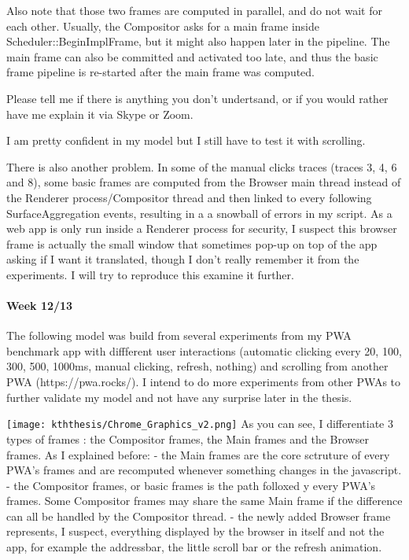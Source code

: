 \documentclass{kththesis}
\begin{document}
Also note that those two frames are computed in parallel, and do not wait for each other. Usually, the Compositor asks for a main frame inside  Scheduler::BeginImplFrame, but it might also happen later in the pipeline. The main frame can also be committed and activated too late, and thus the basic frame pipeline is re-started after the main frame was computed.

Please tell me if there is anything you don't undertsand, or if you would rather have me explain it via Skype or Zoom.

I am pretty confident in my model but I still have to test it with scrolling.

There is also another problem. In some of the manual clicks traces (traces 3, 4, 6 and 8), some basic frames are computed from the Browser main thread instead of the Renderer process/Compositor thread and then linked to every following SurfaceAggregation events, resulting in a a snowball of errors in my script. As a web app is only run inside a Renderer process for security, I suspect this browser frame is actually the small window that sometimes pop-up on top of the app asking if I want it translated, though I don't really remember it from the experiments. I will try to reproduce this examine it further.

\paragraph{Week 12/13}
The following model was build from several experiments from my PWA benchmark app with diffferent user interactions (automatic clicking every 20, 100, 300, 500, 1000ms, manual clicking, refresh, nothing) and scrolling from another PWA (https://pwa.rocks/). I intend to do more experiments from other PWAs to further validate my model and not have any surprise later in the thesis.


\texttt{[image: kththesis/Chrome\_Graphics\_v2.png]}
\newline
As you can see, I differentiate 3 types of frames : the Compositor frames, the Main frames and the Browser frames.
As I explained before:
    - the Main frames are the core sctruture of every PWA's frames and are recomputed whenever something changes in the javascript.
    - the Compositor frames, or basic frames is the path folloxed y every PWA's frames. Some Compositor frames may share the same Main frame if the difference can all be handled by the Compositor thread.
    - the newly added Browser frame represents, I suspect, everything displayed by the browser in itself and not the app, for example the addressbar, the little scroll bar or the refresh animation.
\end{document}
